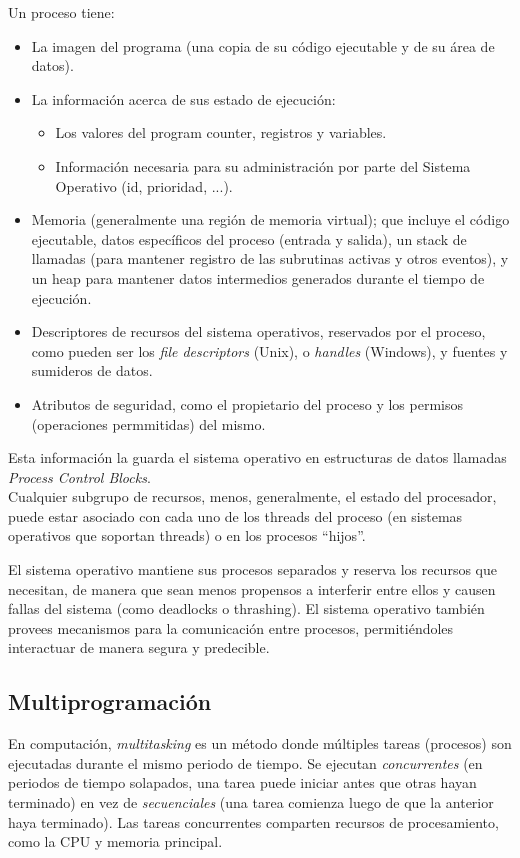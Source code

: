 \documentclass[a4paper, twoside]{article}
\begin{document}
Un proceso tiene:
\begin{itemize}
	\item La imagen del programa (una copia de su código ejecutable y de su área de datos).
	\item La información acerca de sus estado de ejecución:
	\begin{itemize}
		\item Los valores del program counter, registros y variables.
		\item Información necesaria para su administración por parte del Sistema Operativo (id, prioridad, ...).
	\end{itemize}
	\item Memoria (generalmente una región de memoria virtual); que incluye el código ejecutable, datos específicos del proceso (entrada y salida), un stack de llamadas (para mantener registro de las subrutinas activas y otros eventos), y un heap para mantener datos intermedios generados durante el tiempo de ejecución.
	\item Descriptores de recursos del sistema operativos, reservados por el proceso, como pueden ser los \emph{file descriptors} (Unix), o \emph{handles} (Windows), y fuentes y sumideros de datos.
	\item Atributos de seguridad, como el propietario del proceso y los permisos (operaciones permmitidas) del mismo.
\end{itemize}

Esta información la guarda el sistema operativo en estructuras de datos llamadas \emph{Process Control Blocks}.\\

Cualquier subgrupo de recursos, menos, generalmente, el estado del procesador, puede estar asociado con cada uno de los threads del proceso (en sistemas operativos que soportan threads) o en los procesos ``hijos''.

El sistema operativo mantiene sus procesos separados y reserva los recursos que necesitan, de manera que sean menos propensos a interferir entre ellos y causen fallas del sistema (como deadlocks o thrashing). El sistema operativo también provees mecanismos para la comunicación entre procesos, permitiéndoles interactuar de manera segura y predecible.

\subsection{Multiprogramación}
En computación, \emph{multitasking} es un método donde múltiples tareas (procesos) son ejecutadas durante el mismo periodo de tiempo. Se ejecutan \emph{concurrentes} (en periodos de tiempo solapados, una tarea puede iniciar antes que otras hayan terminado) en vez de \emph{secuenciales} (una tarea comienza luego de que la anterior haya terminado). Las tareas concurrentes comparten recursos de procesamiento, como la CPU y memoria principal.\\
\end{document}
